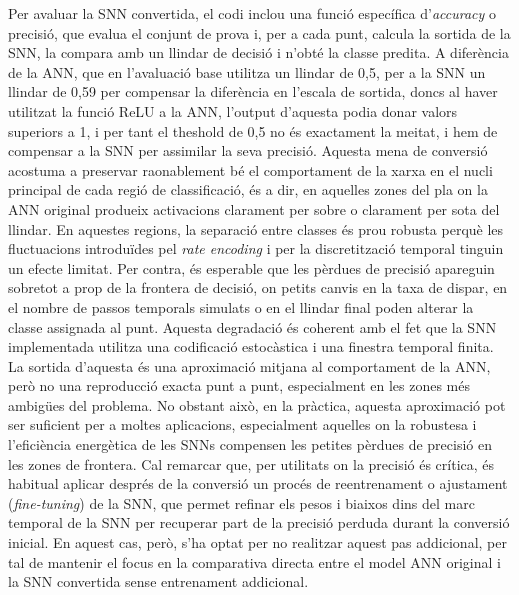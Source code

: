 \documentclass[a4paper,11pt, titlepage, twoside]{article}
\begin{document}
Per avaluar la SNN convertida, el codi inclou una funció específica d'\textit{accuracy} o precisió, que evalua el conjunt de prova i, per a cada punt, calcula la sortida de la SNN, la compara amb un llindar de decisió i n'obté la classe predita. A diferència de la ANN, que en l'avaluació base utilitza un llindar de 0,5, per a la SNN un llindar de 0,59 per compensar la diferència en l'escala de sortida, doncs al haver utilitzat la funció ReLU a la ANN, l'output d'aquesta podia donar valors superiors a 1, i per tant el theshold de 0,5 no és exactament la meitat, i hem de compensar a la SNN per assimilar la seva precisió.
Aquesta mena de conversió acostuma a preservar raonablement bé el comportament de la xarxa en el nucli principal de cada regió de classificació, és a dir, en aquelles zones del pla on la ANN original produeix activacions clarament per sobre o clarament per sota del llindar. En aquestes regions, la separació entre classes és prou robusta perquè les fluctuacions introduïdes pel \textit{rate encoding} i per la discretització temporal tinguin un efecte limitat. Per contra, és esperable que les pèrdues de precisió apareguin sobretot a prop de la frontera de decisió, on petits canvis en la taxa de dispar, en el nombre de passos temporals simulats o en el llindar final poden alterar la classe assignada al punt. Aquesta degradació és coherent amb el fet que la SNN implementada utilitza una codificació estocàstica i una finestra temporal finita. La sortida d'aquesta és una aproximació mitjana al comportament de la ANN, però no una reproducció exacta punt a punt, especialment en les zones més ambigües del problema. No obstant això, en la pràctica, aquesta aproximació pot ser suficient per a moltes aplicacions, especialment aquelles on la robustesa i l'eficiència energètica de les SNNs compensen les petites pèrdues de precisió en les zones de frontera. Cal remarcar que, per utilitats on la precisió és crítica, és habitual aplicar després de la conversió un procés de reentrenament o ajustament (\textit{fine-tuning}) de la SNN, que permet refinar els pesos i biaixos dins del marc temporal de la SNN per recuperar part de la precisió perduda durant la conversió inicial. En aquest cas, però, s'ha optat per no realitzar aquest pas addicional, per tal de mantenir el focus en la comparativa directa entre el model ANN original i la SNN convertida sense entrenament addicional.
\end{document}
